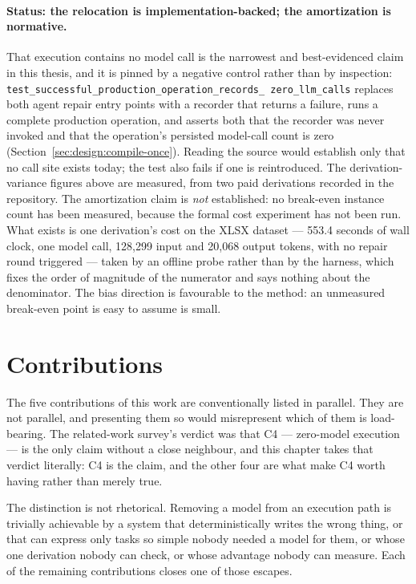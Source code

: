 \paragraph{Status: the relocation is implementation-backed; the amortization is normative.}
That execution contains no model call is the narrowest and best-evidenced claim in this
thesis, and it is pinned by a negative control rather than by inspection:
\texttt{test\_successful\_production\_\allowbreak operation\_records\_\allowbreak
zero\_llm\_calls} replaces both
agent repair entry points with a recorder that returns a failure, runs a complete production
operation, and asserts both that the recorder was never invoked and that the operation's
persisted model-call count is zero (Section~\ref{sec:design:compile-once}). Reading the
source would establish only that no call site exists today; the test also fails if one is
reintroduced. The derivation-variance figures above are measured, from two paid derivations
recorded in the repository. The amortization claim is \emph{not} established: no break-even
instance count has been measured, because the formal cost experiment has not been run. What
exists is one derivation's cost on the XLSX dataset --- 553.4 seconds of wall clock, one
model call, 128{,}299 input and 20{,}068 output tokens, with no repair round triggered ---
taken by an offline probe rather than by the harness, which fixes the order of magnitude of
the numerator and says nothing about the denominator. The bias direction is favourable to the
method: an unmeasured break-even point is easy to assume is small.

\section{Contributions}
\label{sec:intro:contributions}

The five contributions of this work are conventionally listed in parallel. They are not
parallel, and presenting them so would misrepresent which of them is load-bearing. The
related-work survey's verdict was that C4 --- zero-model execution --- is the only claim
without a close neighbour, and this chapter takes that verdict literally: C4 is the claim,
and the other four are what make C4 worth having rather than merely true.

The distinction is not rhetorical. Removing a model from an execution path is trivially
achievable by a system that deterministically writes the wrong thing, or that can express
only tasks so simple nobody needed a model for them, or whose one derivation nobody can
check, or whose advantage nobody can measure. Each of the remaining contributions closes one
of those escapes.

